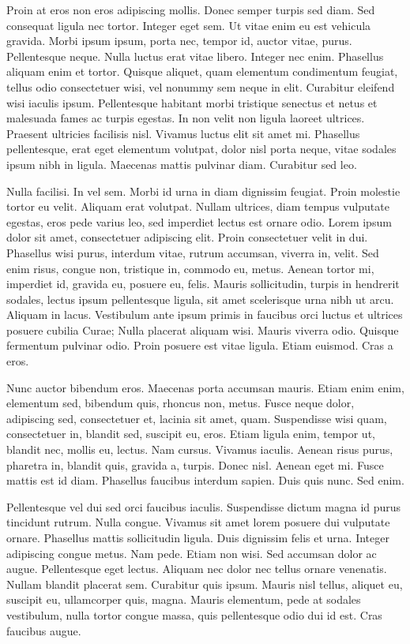Proin at eros non eros adipiscing mollis. Donec semper turpis sed diam. Sed consequat ligula nec tortor. Integer eget sem. Ut vitae enim eu est vehicula gravida. Morbi ipsum ipsum, porta nec, tempor id, auctor vitae, purus. Pellentesque neque. Nulla luctus erat vitae libero. Integer nec enim. Phasellus aliquam enim et tortor. Quisque aliquet, quam elementum condimentum feugiat, tellus odio consectetuer wisi, vel nonummy sem neque in elit. Curabitur eleifend wisi iaculis ipsum. Pellentesque habitant morbi tristique senectus et netus et malesuada fames ac turpis egestas. In non velit non ligula laoreet ultrices. Praesent ultricies facilisis nisl. Vivamus luctus elit sit amet mi. Phasellus pellentesque, erat eget elementum volutpat, dolor nisl porta neque, vitae sodales ipsum nibh in ligula. Maecenas mattis pulvinar diam. Curabitur sed leo.

Nulla facilisi. In vel sem. Morbi id urna in diam dignissim feugiat. Proin molestie tortor eu velit. Aliquam erat volutpat. Nullam ultrices, diam tempus vulputate egestas, eros pede varius leo, sed imperdiet lectus est ornare odio. Lorem ipsum dolor sit amet, consectetuer adipiscing elit. Proin consectetuer velit in dui. Phasellus wisi purus, interdum vitae, rutrum accumsan, viverra in, velit. Sed enim risus, congue non, tristique in, commodo eu, metus. Aenean tortor mi, imperdiet id, gravida eu, posuere eu, felis. Mauris sollicitudin, turpis in hendrerit sodales, lectus ipsum pellentesque ligula, sit amet scelerisque urna nibh ut arcu. Aliquam in lacus. Vestibulum ante ipsum primis in faucibus orci luctus et ultrices posuere cubilia Curae; Nulla placerat aliquam wisi. Mauris viverra odio. Quisque fermentum pulvinar odio. Proin posuere est vitae ligula. Etiam euismod. Cras a eros.

Nunc auctor bibendum eros. Maecenas porta accumsan mauris. Etiam enim enim, elementum sed, bibendum quis, rhoncus non, metus. Fusce neque dolor, adipiscing sed, consectetuer et, lacinia sit amet, quam. Suspendisse wisi quam, consectetuer in, blandit sed, suscipit eu, eros. Etiam ligula enim, tempor ut, blandit nec, mollis eu, lectus. Nam cursus. Vivamus iaculis. Aenean risus purus, pharetra in, blandit quis, gravida a, turpis. Donec nisl. Aenean eget mi. Fusce mattis est id diam. Phasellus faucibus interdum sapien. Duis quis nunc. Sed enim.

Pellentesque vel dui sed orci faucibus iaculis. Suspendisse dictum magna id purus tincidunt rutrum. Nulla congue. Vivamus sit amet lorem posuere dui vulputate ornare. Phasellus mattis sollicitudin ligula. Duis dignissim felis et urna. Integer adipiscing congue metus. Nam pede. Etiam non wisi. Sed accumsan dolor ac augue. Pellentesque eget lectus. Aliquam nec dolor nec tellus ornare venenatis. Nullam blandit placerat sem. Curabitur quis ipsum. Mauris nisl tellus, aliquet eu, suscipit eu, ullamcorper quis, magna. Mauris elementum, pede at sodales vestibulum, nulla tortor congue massa, quis pellentesque odio dui id est. Cras faucibus augue.

